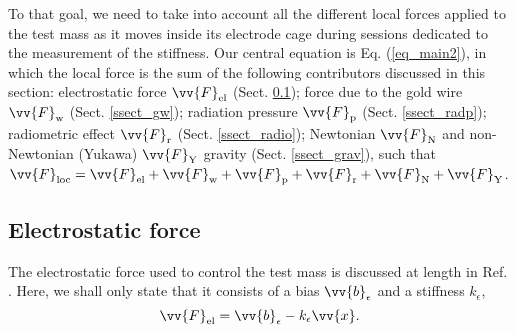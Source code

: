 \documentclass[12pt]{iopart}
\begin{document}
To that goal, we need to take into account all the different local forces applied to the test mass as it moves inside its electrode cage during sessions dedicated to the measurement of the stiffness. 
Our central equation is Eq. (\ref{eq_main2}), in which the local force is the sum of the following contributors discussed in this section:  electrostatic force $\vv{F}_{\rm el}$ (Sect. \ref{ssect_electro}); force due to the gold wire $\vv{F}_{\rm w}$ (Sect. \ref{ssect_gw}); radiation pressure $\vv{F}_{\rm p}$ (Sect. \ref{ssect_radp}); radiometric effect $\vv{F}_{\rm r}$ (Sect. \ref{ssect_radio}); Newtonian $\vv{F}_{\rm N}$ and  non-Newtonian (Yukawa) $\vv{F}_{\rm Y}$ gravity (Sect. \ref{ssect_grav}), such that $\vv{F}_{\rm loc} = \vv{F}_{\rm el} + \vv{F}_{\rm w} + \vv{F}_{\rm p} + \vv{F}_{\rm r} + \vv{F}_{\rm N} + \vv{F}_{\rm Y}$.





\subsection{Electrostatic force} \label{ssect_electro}

The electrostatic force used to control the test mass is discussed at length in Ref. \cite{liorzou20}. Here, we shall only state that it consists of a bias $\vv{b}_\epsilon$ and a stiffness $k_{\epsilon}$,
\begin{equation}
\vv{F}_{\rm el} = \vv{b}_\epsilon - k_{\epsilon} \vv{x}.
\end{equation}
\end{document}
